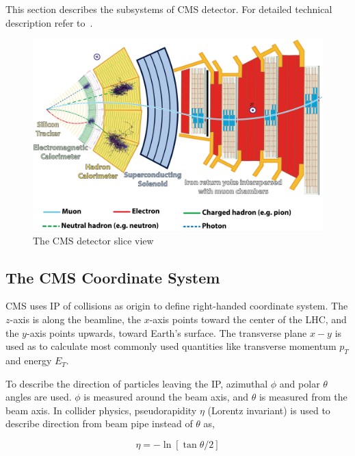 This section describes the subsystems of \gls{CMS} detector.
For detailed technical description refer to~\cite{CMS-JINST-S08004}.

\begin{figure}[!ht]
  \centering
  \includegraphics[width=\textwidth]{figures/cms_slice.png}
  \caption[The CMS detector slice view]%
  {The CMS detector slice view~\cite{image-cms-slice}}%
  \label{fig:cms-slice}
\end{figure}

\subsection{
  The CMS Coordinate System
}\label{ch_cms:cms-coordinate}

CMS uses \gls{IP} of collisions as origin to define right-handed
coordinate system. The \( z \)-axis is along the beamline,
the \( x \)-axis points toward the center of the \gls{LHC},
and the \( y \)-axis points upwards, toward Earth's surface.
The transverse plane \( x - y \) is used as to calculate
most commonly used quantities like transverse momentum \( p_{T} \)
and energy \( E_{T} \).

To describe the direction of particles leaving the \gls{IP},
azimuthal \( \phi \) and polar \( \theta \) angles are used.
\( \phi \) is measured around the beam axis,
and \( \theta \) is measured from the beam axis.
In collider physics, pseudorapidity \( \eta \) (Lorentz invariant) is used
to describe direction from beam pipe instead of \( \theta \) as,

\begin{equation}
  \eta = - \ln[\tan{\theta/2}]
\end{equation}

